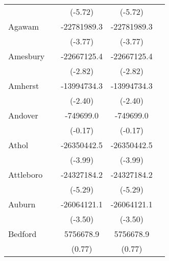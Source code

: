 {\begin{tabular}{l*{4}{c}}
                    &                     &     (-5.72)         &     (-5.72)         &                     \\
\addlinespace
Agawam              &                     & -22781989.3\sym{***}& -22781989.3\sym{***}&                     \\
                    &                     &     (-3.77)         &     (-3.77)         &                     \\
\addlinespace
Amesbury            &                     & -22667125.4\sym{**} & -22667125.4\sym{**} &                     \\
                    &                     &     (-2.82)         &     (-2.82)         &                     \\
\addlinespace
Amherst             &                     & -13994734.3\sym{*}  & -13994734.3\sym{*}  &                     \\
                    &                     &     (-2.40)         &     (-2.40)         &                     \\
\addlinespace
Andover             &                     &   -749699.0         &   -749699.0         &                     \\
                    &                     &     (-0.17)         &     (-0.17)         &                     \\
\addlinespace
Athol               &                     & -26350442.5\sym{***}& -26350442.5\sym{***}&                     \\
                    &                     &     (-3.99)         &     (-3.99)         &                     \\
\addlinespace
Attleboro           &                     & -24327184.2\sym{***}& -24327184.2\sym{***}&                     \\
                    &                     &     (-5.29)         &     (-5.29)         &                     \\
\addlinespace
Auburn              &                     & -26064121.1\sym{***}& -26064121.1\sym{***}&                     \\
                    &                     &     (-3.50)         &     (-3.50)         &                     \\
\addlinespace
Bedford             &                     &   5756678.9         &   5756678.9         &                     \\
                    &                     &      (0.77)         &      (0.77)         &                     \\

\end{tabular}}
